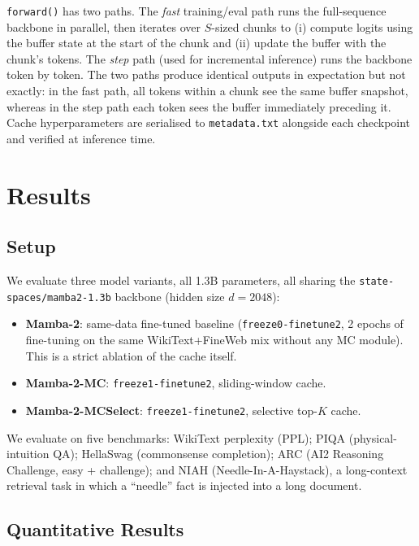 \documentclass{article}
\begin{document}
\texttt{forward()} has two paths. The \emph{fast} training/eval path runs the full-sequence backbone in parallel, then iterates over $S$-sized chunks to (i) compute logits using the buffer state at the start of the chunk and (ii) update the buffer with the chunk's tokens. The \emph{step} path (used for incremental inference) runs the backbone token by token. The two paths produce identical outputs in expectation but not exactly: in the fast path, all tokens within a chunk see the same buffer snapshot, whereas in the step path each token sees the buffer immediately preceding it. Cache hyperparameters are serialised to \texttt{metadata.txt} alongside each checkpoint and verified at inference time.

\section{Results}
\label{sec:results}

\subsection{Setup}

We evaluate three model variants, all 1.3B parameters, all sharing the \texttt{state-spaces/mamba2-1.3b} backbone (hidden size $d{=}2048$):

\begin{itemize}
    \itemsep0pt
    \item \textbf{Mamba-2}: same-data fine-tuned baseline (\texttt{freeze0-finetune2}, 2 epochs of fine-tuning on the same WikiText+FineWeb mix without any MC module). This is a strict ablation of the cache itself.
    \item \textbf{Mamba-2-MC}: \texttt{freeze1-finetune2}, sliding-window cache.
    \item \textbf{Mamba-2-MCSelect}: \texttt{freeze1-finetune2}, selective top-$K$ cache.
\end{itemize}

We evaluate on five benchmarks: WikiText perplexity (PPL); PIQA (physical-intuition QA); HellaSwag (commonsense completion); ARC (AI2 Reasoning Challenge, easy + challenge); and NIAH (Needle-In-A-Haystack), a long-context retrieval task in which a ``needle'' fact is injected into a long document.

\subsection{Quantitative Results}
\end{document}
